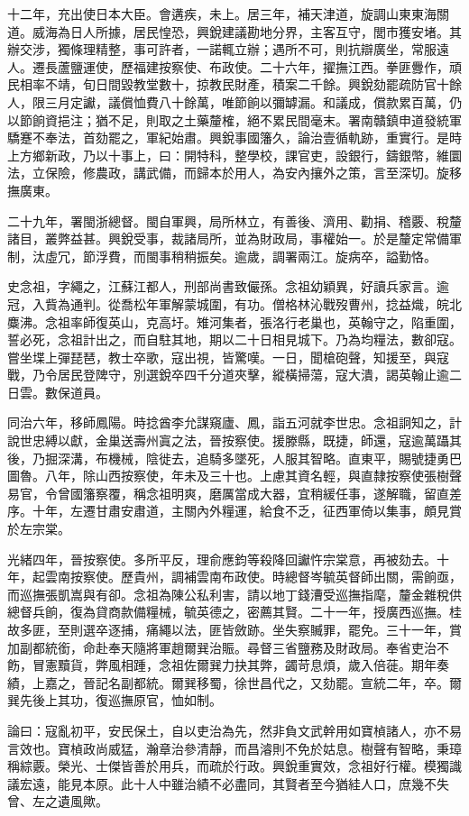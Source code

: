 \begin{pinyinscope}
十二年，充出使日本大臣。會遘疾，未上。居三年，補天津道，旋調山東東海關道。威海為日人所據，居民惶恐，興銳建議勘地分界，主客互守，閭市獲安堵。其辦交涉，獨條理精整，事可許者，一諾輒立辦；遇所不可，則抗辯廣坐，常服遠人。遷長蘆鹽運使，歷福建按察使、布政使。二十六年，擢撫江西。拳匪釁作，頑民相率不靖，旬日間毀教堂數十，掠教民財產，積案二千餘。興銳劾罷疏防官十餘人，限三月定讞，議償恤費八十餘萬，唯節餉以彌罅漏。和議成，償款累百萬，仍以節餉資挹注；猶不足，則取之土藥釐榷，絕不累民間毫末。署南贛鎮申道發統軍驕蹇不奉法，首劾罷之，軍紀始肅。興銳事國籓久，論治壹循軌跡，重實行。是時上方鄉新政，乃以十事上，曰：開特科，整學校，課官吏，設銀行，鑄銀幣，維圜法，立保險，修農政，講武備，而歸本於用人，為安內攘外之策，言至深切。旋移撫廣東。

二十九年，署閩浙總督。閩自軍興，局所林立，有善後、濟用、勸捐、稽覈、稅釐諸目，叢弊益甚。興銳受事，裁諸局所，並為財政局，事權始一。於是釐定常備軍制，汰虛冗，節浮費，而閩事稍稍振矣。逾歲，調署兩江。旋病卒，謚勤恪。

史念祖，字繩之，江蘇江都人，刑部尚書致儼孫。念祖幼穎異，好讀兵家言。逾冠，入貲為通判。從喬松年軍解蒙城圍，有功。僧格林沁戰歿曹州，捻益熾，皖北麋沸。念祖率師復英山，克高圩。雉河集者，張洛行老巢也，英翰守之，陷重圍，誓必死，念祖計出之，而自駐其地，期以二十日相見城下。乃為均糧法，數卻寇。嘗坐堞上彈琵琶，教士卒歌，寇出視，皆驚嘆。一日，聞槍砲聲，知援至，與寇戰，乃令居民登陴守，別選銳卒四千分道夾擊，縱橫掃蕩，寇大潰，謁英翰止逾二日雲。數保道員。

同治六年，移師鳳陽。時捻酋李允謀窺廬、鳳，詣五河就李世忠。念祖詗知之，計說世忠縛以獻，金巢送壽州寘之法，晉按察使。援滕縣，既捷，師還，寇逾萬躡其後，乃掘深溝，布機械，陰徙去，追騎多墜死，人服其智略。直東平，賜號捷勇巴圖魯。八年，除山西按察使，年未及三十也。上慮其資名輕，與直隸按察使張樹聲易官，令曾國籓察覆，稱念祖明爽，磨厲當成大器，宜稍緩任事，遂解職，留直差序。十年，左遷甘肅安肅道，主關內外糧運，給食不乏，征西軍倚以集事，頗見賞於左宗棠。

光緒四年，晉按察使。多所平反，理俞應鈞等殺降回讞忤宗棠意，再被劾去。十年，起雲南按察使。歷貴州，調補雲南布政使。時總督岑毓英督師出關，需餉亟，而巡撫張凱嵩與有卻。念祖為陳公私利害，請以地丁錢漕受巡撫指麾，釐金雜稅供總督兵餉，復為貸商款備糧械，毓英德之，密薦其賢。二十一年，授廣西巡撫。桂故多匪，至則選卒逐捕，痛繩以法，匪皆斂跡。坐失察贓罪，罷免。三十一年，賞加副都統銜，命赴奉天隨將軍趙爾巽治賑。尋督三省鹽務及財政局。奉省吏治不飭，冒憲黷貨，弊風相踵，念祖佐爾巽力抉其弊，蠲苛息煩，歲入倍蓰。期年奏績，上嘉之，晉記名副都統。爾巽移蜀，徐世昌代之，又劾罷。宣統二年，卒。爾巽先後上其功，復巡撫原官，恤如制。

論曰：寇亂初平，安民保土，自以吏治為先，然非負文武幹用如寶楨諸人，亦不易言效也。寶楨政尚威猛，瀚章治參清靜，而昌濬則不免於姑息。樹聲有智略，秉璋稱綜覈。榮光、士傑皆善於用兵，而疏於行政。興銳重實效，念祖好行權。模獨識議宏遠，能見本原。此十人中雖治績不必盡同，其賢者至今猶絓人口，庶幾不失曾、左之遺風歟。


\end{pinyinscope}